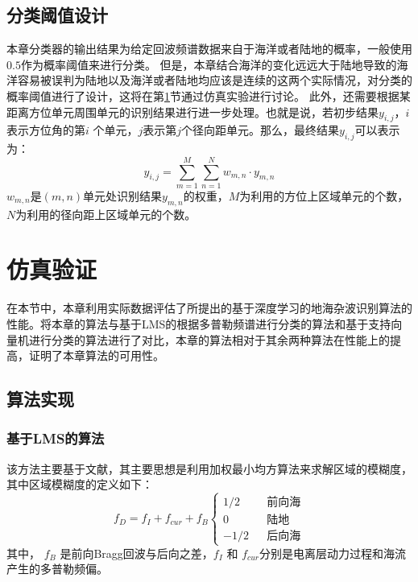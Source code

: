 \subsection{分类阈值设计}
本章分类器的输出结果为给定回波频谱数据来自于海洋或者陆地的概率，一般使用$ 0.5 $作为概率阈值来进行分类。
但是，本章结合海洋的变化远远大于陆地导致的海洋容易被误判为陆地以及海洋或者陆地均应该是连续的这两个实际情况，对分类的概率阈值进行了设计，这将在第\ref{sec:othr_experiment}节通过仿真实验进行讨论。
此外，还需要根据某距离方位单元周围单元的识别结果进行进一步处理。也就是说，若初步结果$y_{i,j}$，$i$表示方位角的第$ i $ 个单元，$ j $表示第$ j $个径向距单元。那么，最终结果$y_{i, j}$可以表示为：
\begin{equation}
y_{i, j} = \sum_{m=1}^{M}\sum_{n=1}^{N}w_{m,n}\cdot y_{m,n}
\end{equation}
$ w_{m,n} $是$(m,n)$单元处识别结果$y_{m,n}$的权重，$M$为利用的方位上区域单元的个数，$N$为利用的径向距上区域单元的个数。
\section{仿真验证}
\label{sec:othr_experiment}
在本节中，本章利用实际数据评估了所提出的基于深度学习的地海杂波识别算法的性能。将本章的算法与基于LMS的根据多普勒频谱进行分类的算法和基于支持向量机进行分类的算法进行了对比，本章的算法相对于其余两种算法在性能上的提高，证明了本章算法的可用性。
\subsection{算法实现}
\subsubsection{基于LMS的算法}
该方法主要基于文献\cite{turley2013high}，其主要思想是利用加权最小均方算法来求解区域的模糊度，其中区域模糊度的定义如下：
\begin{equation}
	f_D = f_I + f_{cur} + f_B\left\{
		\begin{array}{rcl}
		1/2       &      & \text{前向海}\\
		0     &      & \text{陆地}\\
		-1/2       &      & \text{后向海}
		\end{array} \right.
\end{equation}
其中， $f_B$ 是前向Bragg回波与后向之差，$f_I$ 和 $f_{cur}$分别是电离层动力过程和海流产生的多普勒频偏。

